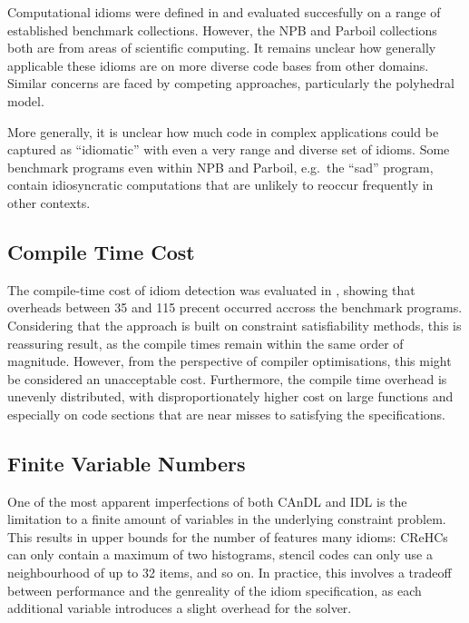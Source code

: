     Computational idioms were defined in
     and
    evaluated succesfully on a range of established benchmark collections.
    However, the NPB and Parboil collections both are from areas of scientific
    computing.
    It remains unclear how generally applicable these idioms are on more
    diverse code bases from other domains.
    Similar concerns are faced by competing approaches, particularly the
    polyhedral model.

    More generally, it is unclear how much code in complex applications could
    be captured as ``idiomatic'' with even a very range and diverse set of
    idioms.
    Some benchmark programs even within NPB and Parboil, e.g.\ the ``sad''
    program, contain idiosyncratic computations that are unlikely to reoccur
    frequently in other contexts.

\subsection*{Compile Time Cost}

    The compile-time cost of idiom detection was evaluated in
    , showing that overheads between 35 and 115 precent
    occurred accross the benchmark programs.
    Considering that the approach is built on constraint satisfiability
    methods, this is reassuring result, as the compile times remain within the
    same order of magnitude.
    However, from the perspective of compiler optimisations, this might be
    considered an unacceptable cost.
    Furthermore, the compile time overhead is unevenly distributed, with
    disproportionately higher cost on large functions and especially on code
    sections that are near misses to satisfying the specifications.

\subsection*{Finite Variable Numbers}

    One of the most apparent imperfections of both CAnDL and IDL is the
    limitation to a finite amount of variables in the underlying constraint
    problem.
    This results in upper bounds for the number of features many idioms:
    CReHCs can only contain a maximum of two histograms, stencil codes can only
    use a neighbourhood of up to 32 items, and so on.
    In practice, this involves a tradeoff between performance and the genreality
    of the idiom specification, as each additional variable introduces a slight
    overhead for the solver.

